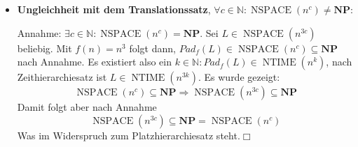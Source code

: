 \documentclass[landscape, 8pt, a4paper]{extarticle}
\newcommand{\npoly}{\textbf{NP}}
\newcommand{\N}{\mathbb{N}}
\begin{document}
\begin{multicols}{3}
\begin{itemize}
		\item \textbf{Ungleichheit mit dem Translationssatz}, $\forall c\in\N: \operatorname{NSPACE}(n^c)\neq \npoly$:

		Annahme: $\exists c\in\N: \operatorname{NSPACE}(n^c)=\npoly$. Sei $L\in\operatorname{NSPACE}(n^{3c})$ beliebig. Mit $f(n)=n^3$ folgt dann, $Pad_f(L)\in\operatorname{NSPACE}(n^c)\subseteq\npoly$ nach Annahme. Es existiert also ein $k\in\N: Pad_f(L)\in\operatorname{NTIME}(n^k)$, nach Zeithierarchiesatz ist $L\in \operatorname{NTIME}(n^{3k})$. Es wurde gezeigt:
		\begin{equation*}
			\operatorname{NSPACE}(n^c)\subseteq\npoly\Rightarrow\operatorname{NSPACE}(n^{3c})\subseteq\npoly
		\end{equation*}
		Damit folgt aber nach Annahme
		\begin{equation*}
			\operatorname{NSPACE}(n^{3c})\subseteq\npoly =\operatorname{NSPACE}(n^c)
		\end{equation*}
		Was im Widerspruch zum Platzhierarchiesatz steht.\hfill$\Box$
	\end{itemize}

\end{multicols}
\end{document}
